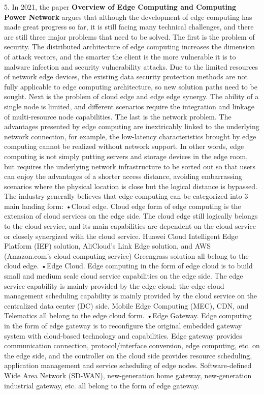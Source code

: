 \documentclass[a4paper,twoside]{scrbook}
\begin{document}
\begin{CJK}{UTF8}{gbsn}
5. In 2021, the paper \textbf{Overview of Edge Computing and Computing Power Network}\cite{ZXTX202103002} argues that although the development of edge computing has made great progress so far, it is still facing many technical challenges, and there are still three major problems that need to be solved. The first is the problem of security. The distributed architecture of edge computing increases the dimension of attack vectors, and the smarter the client is the more vulnerable it is to malware infection and security vulnerability attacks. Due to the limited resources of network edge devices, the existing data security protection methods are not fully applicable to edge computing architecture, so new solution paths need to be sought. Next is the problem of cloud edge and edge edge synergy. The ability of a single node is limited, and different scenarios require the integration and linkage of multi-resource node capabilities. The last is the network problem. The advantages presented by edge computing are inextricably linked to the underlying network connection, for example, the low-latency characteristics brought by edge computing cannot be realized without network support. In other words, edge computing is not simply putting servers and storage devices in the edge room, but requires the underlying network infrastructure to be sorted out so that users can enjoy the advantages of a shorter access distance, avoiding embarrassing scenarios where the physical location is close but the logical distance is bypassed.
The industry generally believes that edge computing can be categorized into 3 main landing form:
•Cloud edge. Cloud edge form of edge computing is the extension of cloud services on the edge side. The cloud edge still logically belongs to the cloud service, and its main capabilities are dependent on the cloud service or closely synergized with the cloud service. Huawei Cloud Intelligent Edge Platform (IEF) solution, AliCloud's Link Edge solution, and AWS (Amazon.com's cloud computing service) Greengrass solution all belong to the cloud edge.
•Edge Cloud. Edge computing in the form of edge cloud is to build small and medium scale cloud service capabilities on the edge side. The edge service capability is mainly provided by the edge cloud; the edge cloud management scheduling capability is mainly provided by the cloud service on the centralized data center (DC) side. Mobile Edge Computing (MEC), CDN, and Telematics all belong to the edge cloud form.
•Edge Gateway. Edge computing in the form of edge gateway is to reconfigure the original embedded gateway system with cloud-based technology and capabilities. Edge gateway provides communication connection, protocol/interface conversion, edge computing, etc. on the edge side, and the controller on the cloud side provides resource scheduling, application management and service scheduling of edge nodes. Software-defined Wide Area Network (SD-WAN), new-generation home gateway, new-generation industrial gateway, etc. all belong to the form of edge gateway.


\end{CJK}
\end{document}
